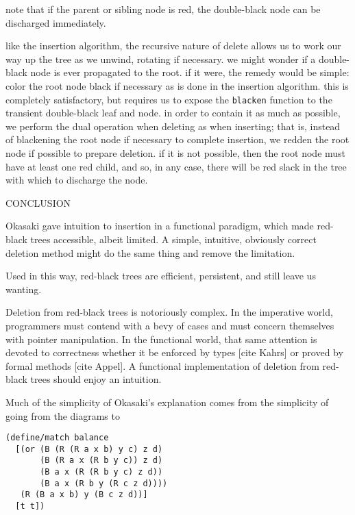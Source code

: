 \documentclass[preprint]{sigplanconf}
\begin{document}
note that if the parent or sibling node is red, the double-black node can be discharged immediately.

like the insertion algorithm, the recursive nature of delete allows us to work our way up the tree as we unwind, rotating if necessary. we might wonder if a double-black node is ever propagated to the root. if it were, the remedy would be simple: color the root node black if necessary as is done in the insertion algorithm. this is completely satisfactory, but requires us to expose the \texttt{blacken} function to the transient double-black leaf and node. in order to contain it as much as possible, we perform the dual operation when deleting as when inserting; that is, instead of blackening the root node if necessary to complete insertion, we redden the root node if possible to prepare deletion. if it is not possible, then the root node must have at least one red child, and so, in any case, there will be red slack in the tree with which to discharge the node.

CONCLUSION

Okasaki gave intuition to insertion in a functional paradigm, which made red-black trees accessible, albeit limited. A simple, intuitive, obviously correct deletion method might do the same thing and remove the limitation.



Used in this way, red-black trees are efficient, persistent, and still leave us wanting.

Deletion from red-black trees is notoriously complex. In the imperative world, programmers must contend with a bevy of cases and must concern themselves with pointer manipulation. In the functional world, that same attention is devoted to correctness whether it be enforced by types [cite Kahrs] or proved by formal methods [cite Appel]. A functional implementation of deletion from red-black trees should enjoy an intuition.







Much of the simplicity of Okasaki's explanation comes from the simplicity of going from the diagrams to
\begin{verbatim}
(define/match balance
  [(or (B (R (R a x b) y c) z d)
       (B (R a x (R b y c)) z d)
       (B a x (R (R b y c) z d))
       (B a x (R b y (R c z d))))
   (R (B a x b) y (B c z d))]
  [t t])
\end{verbatim}
\end{document}
